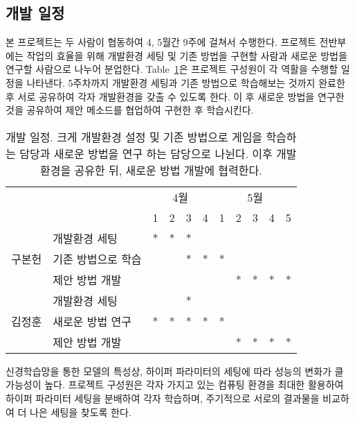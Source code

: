 \subsection{개발 일정}
\label{sec:dev:schedule}
본 프로젝트는 두 사람이 협동하여 4, 5월간 9주에 걸쳐서 수행한다.
프로젝트 전반부에는 작업의 효율을 위해 개발환경 세팅 및 기존 방법을 구현할 사람과 새로운 방법을 연구할 사람으로 나누어 분업한다.
Table~\ref{tab:schedule}은 프로젝트 구성원이 각 역활을 수행할 일정을 나타낸다.
5주차까지 개발환경 세팅과 기존 방법으로 학습해보는 것까지 완료한 후 서로 공유하여 각자 개발환경을 갖출 수 있도록 한다.
이 후 새로운 방법을 연구한 것을 공유하여 제안 메소드를 협업하여 구현한 후 학습시킨다.

\begin{table}[]
\centering
	\caption {
		개발 일정.
		크게 개발환경 설정 및 기존 방법으로 게임을 학습하는 담당과 새로운 방법을 연구 하는 담당으로 나뉜다.
		이후 개발환경을 공유한 뒤, 새로운 방법 개발에 협력한다.
	}
	\label{tab:schedule}
\begin{tabular}{clccccccccc}
\toprule
                     & \multicolumn{1}{c}{} & \multicolumn{4}{c}{4월} & \multicolumn{5}{c}{5월} \\
                     & \multicolumn{1}{c}{} & 1    & 2   & 3   & 4   & 1  & 2  & 3  & 4  & 5  \\
\midrule
\multirow{3}{*}{구본헌} & 개발환경 세팅              & *    & *   & *   &     &    &    &    &    &    \\
                     & 기존 방법으로 학습           &      &     & *   & *   & *  &    &    &    &    \\
                     & 제안 방법 개발             &      &     &     &     &    & *  & *  & *  & *  \\
\midrule
\multirow{3}{*}{김정훈} & 개발환경 세팅              &      &     & *   &     &    &    &    &    &    \\
                     & 새로운 방법 연구           & *    & *   & *   & *   & *  &    &    &    &    \\
                     & 제안 방법 개발             &      &     &     &     &    & *  & *  & *  & * \\
\bottomrule
\end{tabular}
\end{table}

신경학습망을 통한 모델의 특성상, 하이퍼 파라미터의 세팅에 따라 성능의 변화가 클 가능성이 높다.
프로젝트 구성원은 각자 가지고 있는 컴퓨팅 환경을 최대한 활용하여 하이퍼 파라미터 세팅을 분배하여 각자 학습하며, 주기적으로 서로의 결과물을 비교하여 더 나은 세팅을 찾도록 한다.

